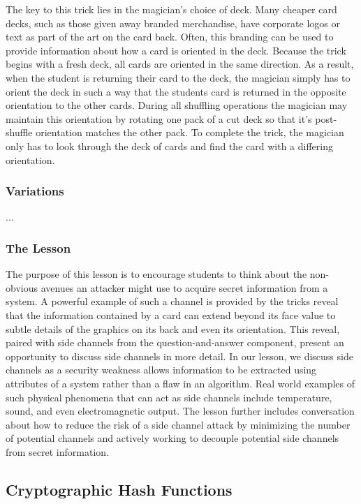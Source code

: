 The key to this trick lies in the magician's choice of deck.  Many cheaper card
decks, such as those given away branded merchandise, have corporate logos or
text as part of the art on the card back.  Often, this branding can be used to
provide information about how a card is oriented in the deck.  Because the trick
begins with a fresh deck, all cards are oriented in the same direction.  As a
result, when the student is returning their card to the deck, the magician
simply has to orient the deck in such a way that the students card is returned
in the opposite orientation to the other cards.  During all shuffling
operations the magician may maintain this orientation by rotating one pack of a
cut deck so that it's post-shuffle orientation matches the other pack.
To complete the trick, the magician only has to look through the deck of cards
and find the card with a differing orientation.

\subsubsection{Variations}

...

\subsubsection{The Lesson}

The purpose of this lesson is to encourage students to think about the
non-obvious avenues an attacker might use to acquire secret information from a
system.  A powerful example of such a channel is provided by the tricks reveal
that the information contained by a card can extend beyond its face value to
subtle details of the graphics on its back and even its orientation.  This
reveal, paired with side channels from the question-and-answer component,
present an opportunity to discuss side channels in more detail.
In our lesson, we discuss side channels as
a security weakness allows information to be extracted using attributes
of a system rather than a flaw in an
algorithm.
Real world examples of such
physical phenomena
that can act as side channels
include temperature,
sound,
and even electromagnetic output.
The lesson further includes conversation about how to
reduce the risk of a side channel attack
by minimizing the number of potential channels
and actively working to decouple potential
side channels from secret information.

\subsection{Cryptographic Hash Functions}

